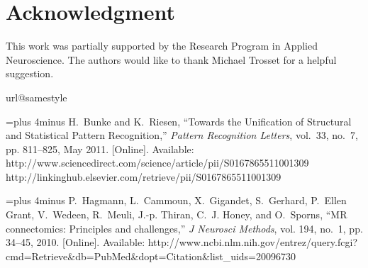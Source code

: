\documentclass[10pt,journal,cspaper,compsoc]{IEEEtran}
\begin{document}
  \section*{Acknowledgment}
\fi

This work was partially supported by the Research Program in Applied Neuroscience. The authors would like to thank Michael Trosset for a helpful suggestion.

\ifCLASSOPTIONcaptionsoff
  \newpage
\fi


% 
% 

\begin{thebibliography}{10}
\providecommand{\url}[1]{#1}
\csname url@samestyle\endcsname
\providecommand{\newblock}{\relax}
\providecommand{\bibinfo}[2]{#2}
\providecommand{\BIBentrySTDinterwordspacing}{\spaceskip=0pt\relax}
\providecommand{\BIBentryALTinterwordstretchfactor}{4}
\providecommand{\BIBentryALTinterwordspacing}{\spaceskip=\fontdimen2\font plus
\BIBentryALTinterwordstretchfactor\fontdimen3\font minus
  \fontdimen4\font\relax}
\providecommand{\BIBforeignlanguage}[2]{{%
\expandafter\ifx\csname l@#1\endcsname\relax
\typeout{** WARNING: IEEEtran.bst: No hyphenation pattern has been}%
\typeout{** loaded for the language `#1'. Using the pattern for}%
\typeout{** the default language instead.}%
\else
\language=\csname l@#1\endcsname
\fi
#2}}
\providecommand{\BIBdecl}{\relax}
\BIBdecl

\BIBentryALTinterwordspacing
H.~Bunke and K.~Riesen, ``{Towards the Unification of Structural and
  Statistical Pattern Recognition},'' \emph{Pattern Recognition Letters},
  vol.~33, no.~7, pp. 811--825, May 2011. [Online]. Available:
  \url{http://www.sciencedirect.com/science/article/pii/S0167865511001309
  http://linkinghub.elsevier.com/retrieve/pii/S0167865511001309}
\BIBentrySTDinterwordspacing

\BIBentryALTinterwordspacing
P.~Hagmann, L.~Cammoun, X.~Gigandet, S.~Gerhard, P.~{Ellen Grant}, V.~Wedeen,
  R.~Meuli, J.-p. Thiran, C.~J. Honey, and O.~Sporns, ``{MR connectomics:
  Principles and challenges},'' \emph{J Neurosci Methods}, vol. 194, no.~1, pp.
  34--45, 2010. [Online]. Available:
  \url{http://www.ncbi.nlm.nih.gov/entrez/query.fcgi?cmd=Retrieve\&db=PubMed\&dopt=Citation\&list\_uids=20096730}
\BIBentrySTDinterwordspacing


\end{thebibliography}
\end{document}
